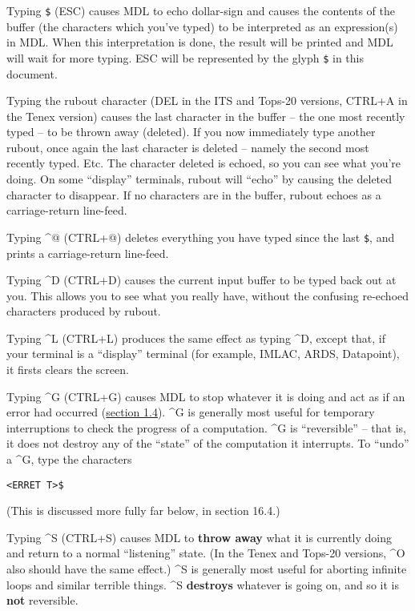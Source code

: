\documentclass[a4paper,]{article}
\begin{document}
Typing \texttt{\$} (ESC) causes MDL to echo dollar-sign and causes the contents of the buffer (the characters which you've
typed) to be interpreted as an expression(s) in MDL. When this interpretation is done, the result will be printed and MDL
will wait for more typing. ESC will be represented by the glyph \texttt{\$} in this document.

Typing the rubout  character (DEL in the ITS  and Tops-20
 versions, CTRL+A in the Tenex  version) causes the last character in the
buffer -- the one most recently typed -- to be thrown away (deleted). If you now immediately type another rubout, once
again the last character is deleted -- namely the second most recently typed. Etc. The character deleted is echoed, so you
can see what you're doing. On some ``display'' terminals, rubout will ``echo'' by causing the deleted character to
disappear. If no characters are in the buffer, rubout echoes as a carriage-return line-feed.

Typing \^{}@  (CTRL+@) deletes everything you have typed since the last \texttt{\$}, and
prints a carriage-return line-feed.

Typing \^{}D  (CTRL+D) causes the current input buffer to be typed back out at you. This
allows you to see what you really have, without the confusing re-echoed characters produced by rubout.

Typing \^{}L  (CTRL+L) produces the same effect as typing \^{}D, except that, if your
terminal is a ``display'' terminal (for example, IMLAC, ARDS, Datapoint), it firsts clears the screen.

Typing \^{}G  (CTRL+G) causes MDL to stop whatever it is doing and act as if an error had
occurred (\protect\hyperlink{14-errors-simple-considerations-1}{section 1.4}). \^{}G is generally most useful for temporary
interruptions to check the progress of a computation. \^{}G is ``reversible'' -- that is, it does not destroy any of the
``state'' of the computation it interrupts. To ``undo'' a \^{}G, type the characters

\begin{verbatim}
<ERRET T>$
\end{verbatim}

(This is discussed more fully far below, in section 16.4.)

Typing \^{}S  (CTRL+S) causes MDL to \textbf{throw away} what it is currently doing and
return to a normal ``listening'' state. (In the Tenex and Tops-20 versions, \^{}O  also
should have the same effect.) \^{}S is generally most useful for aborting infinite loops and similar terrible things. \^{}S
\textbf{destroys} whatever is going on, and so it is \textbf{not} reversible.
\end{document}
